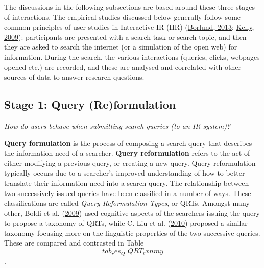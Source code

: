\documentclass[a4paper, nobind]{templates/ociamthesis}
\begin{document}
The discussions in the following subsections are based around these
three stages of interactions. The empirical studies discussed below
generally follow some common principles of user studies in Interactive
IR (IIR) (\protect\hyperlink{ref-borlund2013interactive}{Borlund, 2013}; \protect\hyperlink{ref-kelly2009methods}{Kelly, 2009}): participants are
presented with a search task or search topic, and then they are asked to
search the internet (or a simulation of the open web) for information.
During the search, the various interactions (queries, clicks, webpages
opened etc.) are recorded, and these are analysed and correlated with
other sources of data to answer research questions.

\hypertarget{sec:bg_search_query}{%
\subsection{Stage 1: Query (Re)formulation}\label{sec:bg_search_query}}

\emph{How do users behave when submitting search queries (to an IR system)?}

\textbf{Query formulation} is the process of composing a search query that
describes the information need of a searcher. \textbf{Query reformulation}
refers to the act of either modifying a previous query, or creating a
new query. Query reformulation typically occurs due to a searcher's
improved understanding of how to better translate their information need
into a search query. The relationship between two successively issued
queries have been classified in a number of ways. These classifications
are called \emph{Query Reformulation Types}, or QRTs. Amongst many other,
Boldi et al. (\protect\hyperlink{ref-boldi2009dango}{2009}) used cognitive aspects of the searchers issuing the
query to propose a taxonomy of QRTs, while C. Liu et al. (\protect\hyperlink{ref-liu2010analysis}{2010}) proposed a
similar taxonomy focusing more on the linguistic properties of the two
successive queries. These are compared and contrasted in
Table~\protect\hyperlink{tab_res_Q_QRT_txnmy}{\[tab_res_Q\_QRT_txnmy\]}.
\end{document}
